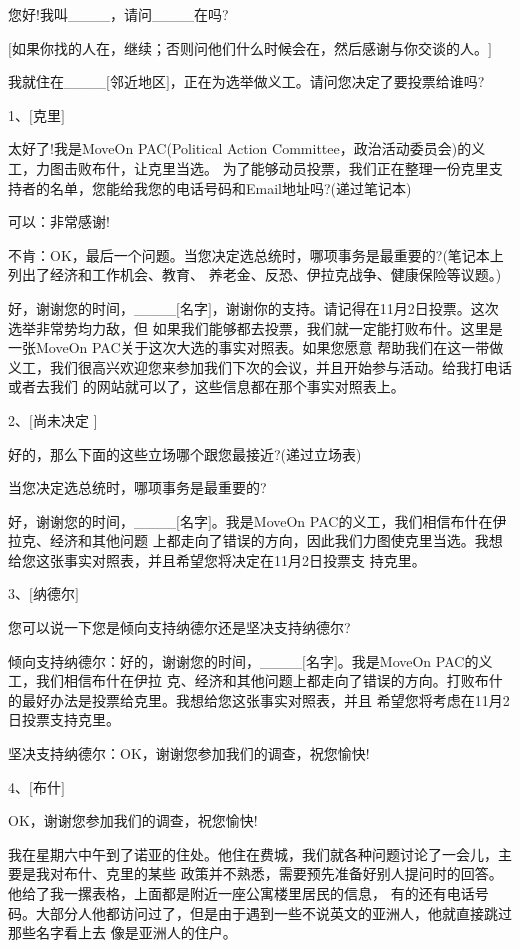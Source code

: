 ﻿\documentclass[11pt]{article}
\begin{document}
您好!我叫\_\_\_\_，请问\_\_\_\_在吗?

$[$如果你找的人在，继续；否则问他们什么时候会在，然后感谢与你交谈的人。$]$

我就住在\_\_\_\_$[$邻近地区$]$，正在为选举做义工。请问您决定了要投票给谁吗?

1、$[$克里$]$

太好了!我是MoveOn PAC(Political Action Committee，政治活动委员会)的义工，力图击败布什，让克里当选。
为了能够动员投票，我们正在整理一份克里支持者的名单，您能给我您的电话号码和Email地址吗?(递过笔记本)

可以：非常感谢!

不肯：OK，最后一个问题。当您决定选总统时，哪项事务是最重要的?(笔记本上列出了经济和工作机会、教育、
养老金、反恐、伊拉克战争、健康保险等议题。)

好，谢谢您的时间，\_\_\_\_$[$名字$]$，谢谢你的支持。请记得在11月2日投票。这次选举非常势均力敌，但
如果我们能够都去投票，我们就一定能打败布什。这里是一张MoveOn PAC关于这次大选的事实对照表。如果您愿意
帮助我们在这一带做义工，我们很高兴欢迎您来参加我们下次的会议，并且开始参与活动。给我打电话或者去我们
的网站就可以了，这些信息都在那个事实对照表上。

2、$[$尚未决定 $]$

好的，那么下面的这些立场哪个跟您最接近?(递过立场表)

当您决定选总统时，哪项事务是最重要的?

好，谢谢您的时间，\_\_\_\_$[$名字$]$。我是MoveOn PAC的义工，我们相信布什在伊拉克、经济和其他问题
上都走向了错误的方向，因此我们力图使克里当选。我想给您这张事实对照表，并且希望您将决定在11月2日投票支
持克里。

3、$[$纳德尔$]$

您可以说一下您是倾向支持纳德尔还是坚决支持纳德尔?

倾向支持纳德尔：好的，谢谢您的时间，\_\_\_\_$[$名字$]$。我是MoveOn PAC的义工，我们相信布什在伊拉
克、经济和其他问题上都走向了错误的方向。打败布什的最好办法是投票给克里。我想给您这张事实对照表，并且
希望您将考虑在11月2日投票支持克里。

坚决支持纳德尔：OK，谢谢您参加我们的调查，祝您愉快!

4、$[$布什$]$

OK，谢谢您参加我们的调查，祝您愉快!

我在星期六中午到了诺亚的住处。他住在费城，我们就各种问题讨论了一会儿，主要是我对布什、克里的某些
政策并不熟悉，需要预先准备好别人提问时的回答。他给了我一摞表格，上面都是附近一座公寓楼里居民的信息，
有的还有电话号码。大部分人他都访问过了，但是由于遇到一些不说英文的亚洲人，他就直接跳过那些名字看上去
像是亚洲人的住户。
\end{document}
